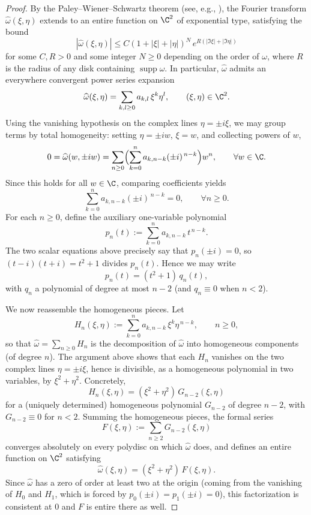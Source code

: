\begin{proof}
By the Paley--Wiener--Schwartz theorem (see, e.g.,
\cite{Hormander,Folland}), the Fourier
transform $\widehat\omega(\xi,\eta)$ extends to an entire function on $\C^2$
of exponential type, satisfying the bound
\[
|\widehat\omega(\xi,\eta)|\le C(1+|\xi|+|\eta|)^{N}\,e^{R(|\Im\xi|+|\Im\eta|)}
\]
for some $C,R>0$ and some integer $N\ge 0$ depending on the order of
$\omega$, where $R$ is the radius of any disk containing
$\operatorname{supp}\omega$. In particular, $\widehat\omega$ admits an
everywhere convergent power series expansion
\[
\widehat{\omega}(\xi,\eta)=\sum_{k,l\ge 0} a_{k,l}\,\xi^k\eta^l,
\qquad (\xi,\eta)\in\C^2.
\]
Using the vanishing hypothesis on the complex lines $\eta=\pm i\xi$, we may
group terms by total homogeneity: setting $\eta=\pm iw$, $\xi=w$, and
collecting powers of $w$,
\[
0=\widehat{\omega}(w,\pm iw)
   =\sum_{n\ge 0}\Bigl(\sum_{k=0}^n a_{k,n-k}(\pm i)^{\,n-k}\Bigr)w^n,
\qquad \forall w\in\C.
\]
Since this holds for all $w\in\C$, comparing coefficients yields
\[
\sum_{k=0}^n a_{k,n-k}(\pm i)^{\,n-k}=0,\qquad \forall n\ge 0.
\]
For each $n\ge 0$, define the auxiliary one-variable polynomial
\[
p_n(t):=\sum_{k=0}^n a_{k,n-k}\, t^{\,n-k}.
\]
The two scalar equations above precisely say that $p_n(\pm i)=0$, so
$(t-i)(t+i)=t^2+1$ divides $p_n(t)$. Hence we may write
\[
p_n(t)=(t^2+1)\,q_n(t),
\]
with $q_n$ a polynomial of degree at most $n-2$ (and $q_n\equiv 0$ when
$n<2$).

We now reassemble the homogeneous pieces. Let
\[
H_n(\xi,\eta):=\sum_{k=0}^n a_{k,n-k}\,\xi^k\eta^{\,n-k},
\qquad n\ge 0,
\]
so that $\widehat\omega=\sum_{n\ge 0}H_n$ is the decomposition of
$\widehat\omega$ into homogeneous components (of degree $n$). The argument
above shows that each $H_n$ vanishes on the two complex lines
$\eta=\pm i\xi$, hence is divisible, as a homogeneous polynomial in two
variables, by $\xi^2+\eta^2$. Concretely,
\[
H_n(\xi,\eta)=(\xi^2+\eta^2)\,G_{n-2}(\xi,\eta)
\]
for a (uniquely determined) homogeneous polynomial $G_{n-2}$ of degree
$n-2$, with $G_{n-2}\equiv 0$ for $n<2$. Summing the homogeneous pieces, the
formal series
\[
F(\xi,\eta):=\sum_{n\ge 2} G_{n-2}(\xi,\eta)
\]
converges absolutely on every polydisc on which $\widehat\omega$ does, and
defines an entire function on $\C^2$ satisfying
\[
\widehat{\omega}(\xi,\eta)=(\xi^2+\eta^2)\,F(\xi,\eta).
\]
Since $\widehat\omega$ has a zero of order at least two at the origin
(coming from the vanishing of $H_0$ and $H_1$, which is forced by
$p_0(\pm i)=p_1(\pm i)=0$), this factorization is consistent at $0$ and $F$
is entire there as well.


\end{proof}
